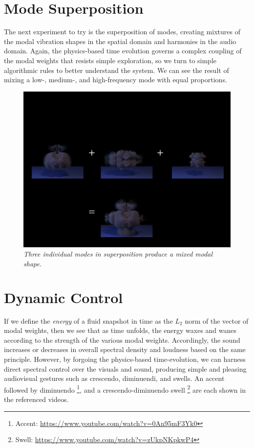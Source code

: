 \section{Mode Superposition}
The next experiment to try is the superposition of modes, creating mixtures of the modal vibration shapes in the spatial domain and harmonies in the audio domain. Again, the physics-based time evolution governs a complex coupling of the modal weights that resists simple exploration, so we turn to simple algorithmic rules to better understand the system. We can see the result of mixing a low-, medium-, and high-frequency mode with equal proportions.

\begin{figure}
	\centering
	\includegraphics[width=\textwidth]{chap6/figures/superposition.png}
	\caption{\em Three individual modes in superposition produce a mixed modal shape.}
\label{fig:superposition}
\end{figure}

\section{Dynamic Control}
If we define the {\em energy} of a fluid snapshot in time as the $L_2$ norm of the vector of modal weights, then we see that as time unfolds, the energy waxes and wanes according to the strength
of the various modal weights. Accordingly, the sound increases or decreases in overall spectral density and loudness based on the same principle. However, by forgoing the physics-based time-evolution,
we can harness direct spectral control over the visuals and sound, producing simple and pleasing audiovisual gestures such as crescendo, diminuendi, and swells. An accent followed by diminuendo \footnote{Accent: \url{https://www.youtube.com/watch?v=0An95mF3Yk0}}, and a crescendo-diminuendo swell \footnote{Swell: \url{https://www.youtube.com/watch?v=zUkpNKpkwP4}} are each shown in the referenced videos.

